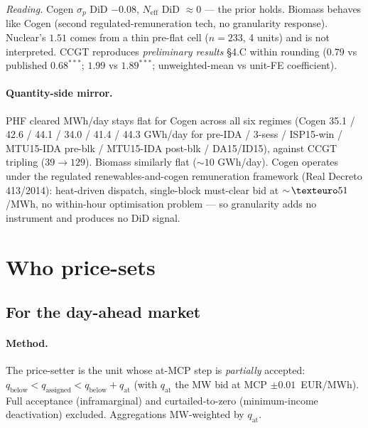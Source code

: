 \documentclass[11pt,a4paper]{article}
\begin{document}
\textit{Reading.} Cogen $\sigma_p$ DiD $-0.08$, $N_{\text{eff}}$ DiD $\approx\!0$ --- the prior holds. Biomass behaves like Cogen (second regulated-remuneration tech, no granularity response). Nuclear's $1.51$ comes from a thin pre-flat cell ($n=233$, 4 units) and is not interpreted. CCGT reproduces \emph{preliminary results} \S 4.C within rounding ($0.79$ vs published $0.68^{***}$; $1.99$ vs $1.89^{***}$; unweighted-mean vs unit-FE coefficient).

\paragraph{Quantity-side mirror.} PHF cleared MWh/day stays flat for Cogen across all six regimes (Cogen 35.1 / 42.6 / 44.1 / 34.0 / 41.4 / 44.3 GWh/day for pre-IDA / 3-sess / ISP15-win / MTU15-IDA pre-blk / MTU15-IDA post-blk / DA15/ID15), against CCGT tripling ($39 \to 129$). Biomass similarly flat ($\sim 10$ GWh/day). Cogen operates under the regulated renewables-and-cogen remuneration framework (Real Decreto 413/2014): heat-driven dispatch, single-block must-clear bid at $\sim\!\texteuro 51$/MWh, no within-hour optimisation problem --- so granularity adds no instrument and produces no DiD signal.

\bigskip

\section{Who price-sets}\label{sec:prov:pricesetter}

\subsection{For the day-ahead market}\label{sec:prov:pricesetter_da}

\paragraph{Method.} The price-setter is the unit whose at-MCP step is \emph{partially} accepted: $q_{\text{below}} < q_{\text{assigned}} < q_{\text{below}} + q_{\text{at}}$ (with $q_{\text{at}}$ the MW bid at MCP $\pm 0.01$~EUR/MWh). Full acceptance (inframarginal) and curtailed-to-zero (minimum-income deactivation) excluded. Aggregations MW-weighted by $q_{\text{at}}$.
\end{document}
